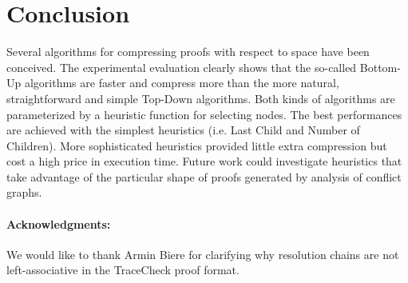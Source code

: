 \section{Conclusion}
\label{sec:conclusion}

Several algorithms for compressing proofs with respect to space have been conceived. The experimental evaluation clearly shows that the so-called Bottom-Up algorithms are faster and compress more than the more natural, straightforward and simple Top-Down algorithms. Both kinds of algorithms are parameterized by a heuristic function for selecting nodes. The best performances are achieved with the simplest heuristics (i.e. Last Child and Number of Children). More sophisticated heuristics provided little extra compression but cost a high price in execution time. Future work could investigate heuristics that take advantage of the particular shape of proofs generated by analysis of conflict graphs.

\vspace{-5pt}
\paragraph{Acknowledgments:} We would like to thank Armin Biere for clarifying why resolution chains are not left-associative in the TraceCheck proof format.

\vspace{-5pt}

